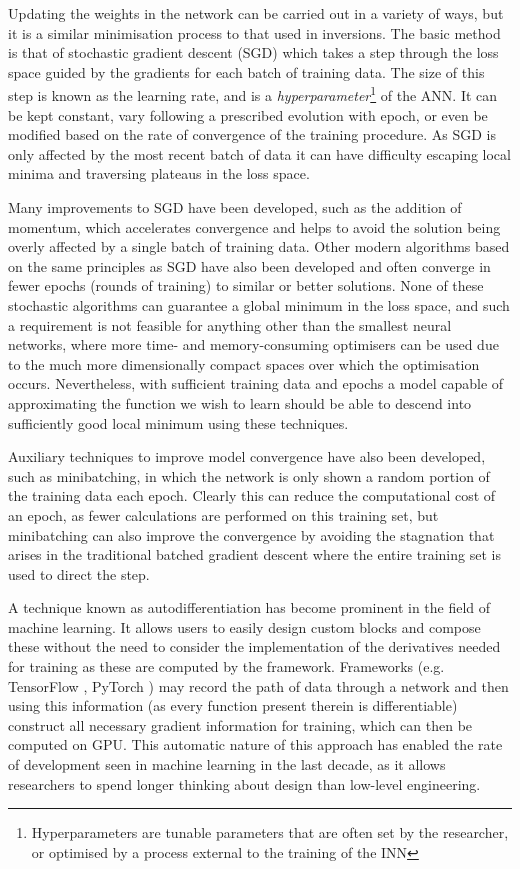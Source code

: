 Updating the weights in the network can be carried out in a variety of ways, but it is a similar minimisation process to that used in inversions.
The basic method is that of stochastic gradient descent (SGD) which takes a step through the loss space guided by the gradients for each batch of training data.
The size of this step is known as the learning rate, and is a \emph{hyperparameter}\footnote{Hyperparameters are tunable parameters that are often set by the researcher, or optimised by a process external to the training of the INN} of the ANN.
It can be kept constant, vary following a prescribed evolution with epoch, or even be modified based on the rate of convergence of the training procedure.
As SGD is only affected by the most recent batch of data it can have difficulty escaping local minima and traversing plateaus in the loss space.

Many improvements to SGD have been developed, such as the addition of momentum, which accelerates convergence and helps to avoid the solution being overly affected by a single batch of training data.
Other modern algorithms based on the same principles as SGD have also been developed \citep[e.g. the Adam algorithm,][]{2014Kingma} and often converge in fewer epochs (rounds of training) to similar or better solutions.
None of these stochastic algorithms can guarantee a global minimum in the loss space, and such a requirement is not feasible for anything other than the smallest neural networks, where more time- and memory-consuming optimisers can be used due to the much more dimensionally compact spaces over which the optimisation occurs.
Nevertheless, with sufficient training data and epochs a model capable of approximating the function we wish to learn should be able to descend into sufficiently good local minimum using these techniques.

Auxiliary techniques to improve model convergence have also been developed, such as minibatching, in which the network is only shown a random portion of the training data each epoch.
Clearly this can reduce the computational cost of an epoch, as fewer calculations are performed on this training set, but minibatching can also improve the convergence by avoiding the stagnation that arises in the traditional batched gradient descent where the entire training set is used to direct the step.

A technique known as autodifferentiation has become prominent in the field of machine learning.
It allows users to easily design custom blocks and compose these without the need to consider the implementation of the derivatives needed for training as these are computed by the framework.
Frameworks (e.g. TensorFlow \citep{Abadi2016}, PyTorch \citep{PyTorch}) may record the path of data through a network and then using this information (as every function present therein is differentiable) construct all necessary gradient information for training, which can then be computed on GPU.
This automatic nature of this approach has enabled the rate of development seen in machine learning in the last decade, as it allows researchers to spend longer thinking about design than low-level engineering.

